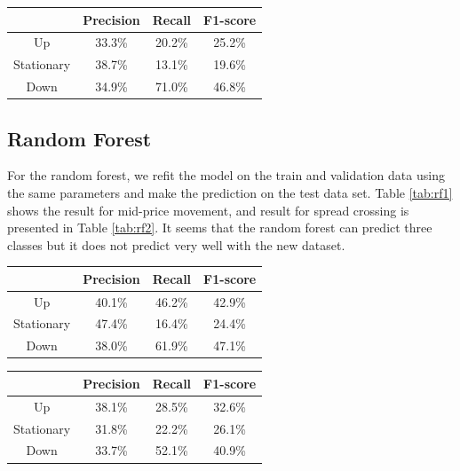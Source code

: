 \documentclass[11pt]{article}
\begin{document}
\begin{center}
   \label{tab:svm2} 
  \begin{tabular}{|c | c | c | c|} 
    \hline
    & Precision & Recall & F1-score \\
    \hline
    Up & 33.3\% & 20.2\%  & 25.2\% \\ 
    \hline
    Stationary & 38.7\% & 13.1\% & 19.6\% \\
    \hline
    Down & 34.9\% & 71.0\% & 46.8\%  \\
    \hline
  \end{tabular}
\end{center}

\subsection{Random Forest}
For the random forest, we refit the model on the train and validation data using the same parameters and make the prediction on the test data set. Table \ref{tab:rf1} shows the result for mid-price movement, and result for spread crossing is presented in Table \ref{tab:rf2}. It seems that the random forest can predict three classes but it does not predict very well with the new dataset.

\begin{center}
   \label{tab:rf1} 
  \begin{tabular}{|c | c | c | c|} 
    \hline
     & Precision & Recall & F1-score \\
    \hline
    Up & 40.1\%  & 46.2\% & 42.9\% \\ 
    \hline
    Stationary & 47.4\% & 16.4\% & 24.4\% \\
    \hline
    Down &  38.0\% & 61.9\%  & 47.1\%  \\
    \hline
  \end{tabular}
\end{center}

\begin{center}
   \label{tab:rf2} 
  \begin{tabular}{|c | c | c | c|} 
    \hline
     & Precision & Recall & F1-score  \\
    \hline
    Up &  38.1\% & 28.5\% & 32.6\% \\ 
    \hline
    Stationary & 31.8\% & 22.2\% & 26.1\% \\
    \hline
    Down & 33.7\% & 52.1\% & 40.9\% \\
    \hline
  \end{tabular}
\end{center}
\end{document}
